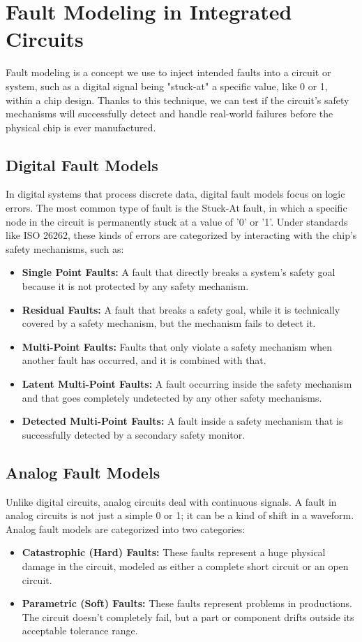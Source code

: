 \documentclass[12pt, a4paper]{article}
\begin{document}
\newpage

\section{Fault Modeling in Integrated Circuits}
Fault modeling is a concept we use to inject intended faults into a circuit or system, such as a digital signal being "stuck-at" a specific value, like 0 or 1, within a chip design. Thanks to this technique, we can test if the circuit's safety mechanisms will successfully detect and handle real-world failures before the physical chip is ever manufactured.
\subsection{Digital Fault Models}
In digital systems that process discrete data, digital fault models focus on logic errors. The most common type of fault is the Stuck-At fault, in which a specific node in the circuit is permanently stuck at a value of '0' or '1'.
Under standards like ISO 26262, these kinds of errors are categorized by interacting with the chip's safety mechanisms, such as:
\begin{itemize}
  \item \textbf{Single Point Faults:} A fault that directly breaks a system's safety goal because it is not protected by any safety mechanism.
  \item \textbf{Residual Faults:} A fault that breaks a safety goal, while it is technically covered by a safety mechanism, but the mechanism fails to detect it.
  \item \textbf{Multi-Point Faults:} Faults that only violate a safety mechanism when another fault has occurred, and it is combined with that.
  \item \textbf{Latent Multi-Point Faults:} A fault occurring inside the safety mechanism and that goes completely undetected by any other safety mechanisms.
  \item \textbf{Detected Multi-Point Faults:} A fault inside a safety mechanism that is successfully detected by a secondary safety monitor.
\end{itemize}
\subsection{Analog Fault Models}
Unlike digital circuits, analog circuits deal with continuous signals. A fault in analog circuits is not just a simple 0 or 1; it can be a kind of shift in a waveform. Analog fault models are categorized into two categories:
\begin{itemize}
    \item \textbf{Catastrophic (Hard) Faults:} These faults represent a huge physical damage in the circuit, modeled as either a complete short circuit or an open circuit.
    \item \textbf{Parametric (Soft) Faults:} These faults represent problems in productions. The circuit doesn't completely fail, but a part or component drifts outside its acceptable tolerance range.
\end{itemize}
\end{document}
